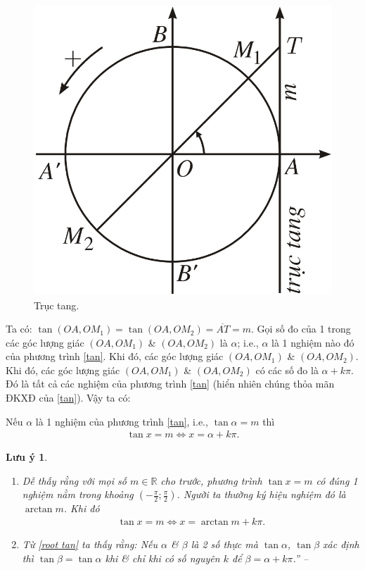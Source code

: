 \documentclass[oneside]{book}
\numberwithin{equation}{section}
\newtheorem{luuy}{Lưu ý}[section]
\begin{document}
\begin{figure}[H]
	\centering
	\includegraphics[scale=0.15]{truc_tan}
	\caption{Trục tang.}
	\label{fig:truc tan}
\end{figure}
Ta có: $\tan(OA,OM_1) = \tan(OA,OM_2) = \overline{AT} = m$. Gọi số đo của 1 trong các góc lượng giác $(OA,OM_1)$ \& $(OA,OM_2)$ là $\alpha$; i.e., $\alpha$ là 1 nghiệm nào đó của phương trình \eqref{tan}. Khi đó, các góc lượng giác $(OA,OM_1)$ \& $(OA,OM_2)$. Khi đó, các góc lượng giác $(OA,OM_1)$ \& $(OA,OM_2)$ có các số đo là $\alpha + k\pi$. Đó là tất cả các nghiệm của phương trình \eqref{tan} (hiển nhiên chúng thỏa mãn ĐKXĐ của \eqref{tan}). Vậy ta có:

\begin{tcolorbox}
	Nếu $\alpha$ là 1 nghiệm của phương trình \eqref{tan}, i.e., $\tan\alpha = m$ thì
	\begin{align}
		\label{root tan}
		\tan x = m\Leftrightarrow x = \alpha + k\pi.
	\end{align}
\end{tcolorbox}

\begin{luuy}
	\begin{enumerate}
		\item Dễ thấy rằng với mọi số $m\in\mathbb{R}$ cho trước, phương trình $\tan x = m$ có đúng 1 nghiệm nằm trong khoảng $\left(-\frac{\pi}{2};\frac{\pi}{2}\right)$. Người ta thường ký hiệu nghiệm đó là $\arctan m$. Khi đó
		\begin{align*}
			\boxed{\tan x = m\Leftrightarrow x = \arctan m + k\pi.}
		\end{align*}
		\item Từ \eqref{root tan} ta thấy rằng: Nếu $\alpha$ \& $\beta$ là 2 số thực mà $\tan\alpha$, $\tan\beta$ xác định thì $\tan\beta = \tan\alpha$ khi \& chỉ khi có số nguyên $k$ để $\beta = \alpha + k\pi$.'' -- \cite[pp. 25--26]{SGK_Toan_11_dai_so_giai_tich_nang_cao}
	\end{enumerate}
\end{luuy}
\end{document}
